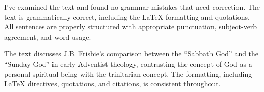 I've examined the text and found no grammar mistakes that need correction. The text is grammatically correct, including the LaTeX formatting and quotations. All sentences are properly structured with appropriate punctuation, subject-verb agreement, and word usage.

The text discusses J.B. Frisbie's comparison between the “Sabbath God” and the “Sunday God” in early Adventist theology, contrasting the concept of God as a personal spiritual being with the trinitarian concept. The formatting, including LaTeX directives, quotations, and citations, is consistent throughout.